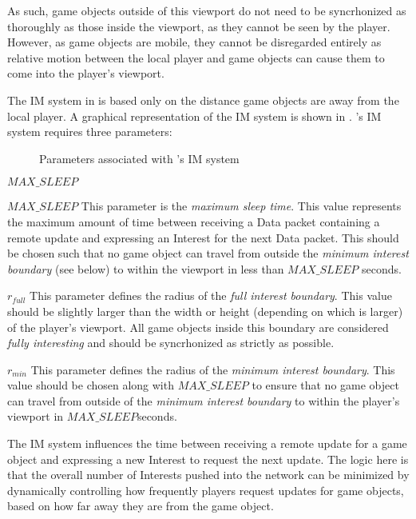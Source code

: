 As such, game objects outside of this viewport do not need to be syncrhonized as thoroughly as those inside the viewport, as they cannot be seen by the player. However, as game objects are mobile, they cannot be disregarded entirely as relative motion between the local player and game objects can cause them to come into the player's viewport. 

The IM system in \game{} is based only on the distance game objects are away from the local player. A graphical representation of the IM system is shown in . \game{}'s IM system requires three parameters:

\begin{figure}[H]
    \centering
    \caption{Parameters associated with \game{}'s IM system}
    \label{fig:des:interest-regions}
\end{figure}

\begin{labeling}{$MAX\_SLEEP$ }
    \item [$MAX\_SLEEP$] This parameter is the \textit{maximum sleep time}. This value represents the maximum amount of time between receiving a Data packet containing a remote update and expressing an Interest for the next Data packet. This should be chosen such that no game object can travel from outside the \textit{minimum interest boundary} (see below) to within the viewport in less than $MAX\_SLEEP$ seconds. 
    \item [$r_{full}$] This parameter defines the radius of the \textit{full interest boundary}. This value should be slightly larger than the width or height (depending on which is larger) of the player's viewport. All game objects inside this boundary are considered \textit{fully interesting} and should be syncrhonized as strictly as possible.
    \item [$r_{min}$] This parameter defines the radius of the \textit{minimum interest boundary}. This value should be chosen along with $MAX\_SLEEP$ to ensure that no game object can travel from outside of the \textit{minimum interest boundary} to within the player's viewport in $MAX\_SLEEP$seconds. 
\end{labeling}
    
The IM system influences the time between receiving a remote update for a game object and expressing a new Interest to request the next update. The logic here is that the overall number of Interests pushed into the network can be minimized by dynamically controlling how frequently players request updates for game objects, based on how far away they are from the game object.


